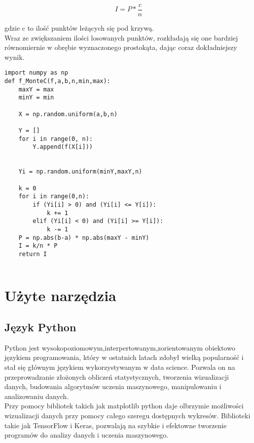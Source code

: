 \documentclass[12pt,twoside]{article}
\begin{document}
\begin{equation}
I = P * \frac{c}{n}
\end{equation}

gdzie c to ilość punktów leżących się pod krzywą.\\

Wraz ze zwiększaniem ilości losowanych punktów, rozkładają się one bardziej równomiernie w obrębie wyznaczonego prostokąta, dając coraz dokładniejszy wynik.\cite{MonteCarlo_2}

\begin{lstlisting}[caption={Kod w języku python implementujący metodę Crude Monte Carlo}]
import numpy as np
def f_MonteC(f,a,b,n,min,max):
    maxY = max
    minY = min

    X = np.random.uniform(a,b,n)

    Y = []
    for i in range(0, n):
        Y.append(f(X[i]))


    Yi = np.random.uniform(minY,maxY,n) 
   
    k = 0
    for i in range(0,n):
        if (Yi[i] > 0) and (Yi[i] <= Y[i]):
            k += 1
        elif (Yi[i] < 0) and (Yi[i] >= Y[i]):
            k -= 1
    P = np.abs(b-a) * np.abs(maxY - minY)
    I = k/n * P
    return I
    
\end{lstlisting}
\label{Listing 7}


\section{Użyte narzędzia}

\subsection{Język Python}

Python jest  wysokopoziomowym,interpertowanym,zorientowanym obiektowo językiem programowania, który w ostatnich latach zdobył wielką popularność i stał się głównym językiem wykorzystywanym w data science.\cite{Python_1} Pozwala on na przeprowadzanie złożonych obliczeń statystycznych, tworzenia wizualizacji danych, budowania algorytmów uczenia maszynowego, manipulowaniu i analizowaniu danych.\\
Przy pomocy bibliotek takich jak matplotlib python daje olbrzymie możliwości wizualizacji danych przy pomocy całego szeregu dostępnych wykresów.
Biblioteki takie jak TensorFlow i Keras, pozwalają na szybkie i efektowne tworzenie programów do analizy danych i uczenia maszynowego.\cite{Python_2}
\end{document}
